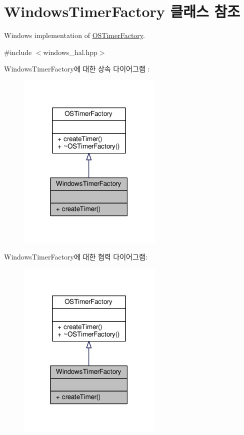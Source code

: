 \hypertarget{class_windows_timer_factory}{}\section{Windows\+Timer\+Factory 클래스 참조}
\label{class_windows_timer_factory}


Windows implementation of \hyperlink{class_o_s_timer_factory}{O\+S\+Timer\+Factory}.  




{\ttfamily \#include $<$windows\+\_\+hal.\+hpp$>$}



Windows\+Timer\+Factory에 대한 상속 다이어그램 \+: 
\nopagebreak
\begin{figure}[H]
\begin{center}
\leavevmode
\includegraphics[width=195pt]{class_windows_timer_factory__inherit__graph}
\end{center}
\end{figure}


Windows\+Timer\+Factory에 대한 협력 다이어그램\+:
\nopagebreak
\begin{figure}[H]
\begin{center}
\leavevmode
\includegraphics[width=195pt]{class_windows_timer_factory__coll__graph}
\end{center}
\end{figure}
